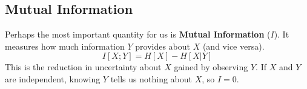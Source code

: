 \subsection{Mutual Information}
Perhaps the most important quantity for us is \textbf{Mutual Information} ($I$). It measures how much information $Y$ provides about $X$ (and vice versa).
\begin{equation}
    I[X; Y] = H[X] - H[X|Y]
\end{equation}
This is the reduction in uncertainty about $X$ gained by observing $Y$. If $X$ and $Y$ are independent, knowing $Y$ tells us nothing about $X$, so $I=0$.
